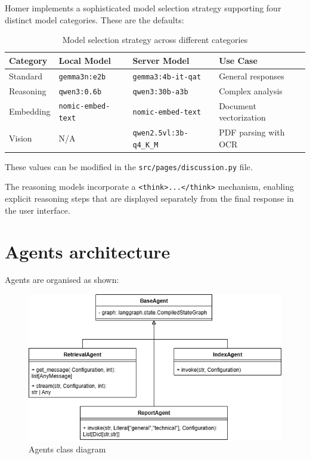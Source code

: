 \documentclass[11pt,a4paper]{report}
\begin{document}
Homer implements a sophisticated model selection strategy supporting four distinct model categories. These are the defaults:

\begin{table}[H]
\centering
\begin{tabular}{@{}llll@{}}
\toprule
\textbf{Category} & \textbf{Local Model} & \textbf{Server Model} & \textbf{Use Case} \\
\midrule
Standard & \texttt{gemma3n:e2b} & \texttt{gemma3:4b-it-qat} & General responses \\
Reasoning & \texttt{qwen3:0.6b} & \texttt{qwen3:30b-a3b} & Complex analysis \\
Embedding & \texttt{nomic-embed-text} & \texttt{nomic-embed-text} & Document vectorization \\
Vision & N/A & \texttt{qwen2.5vl:3b-q4\_K\_M} & PDF parsing with OCR \\
\bottomrule
\end{tabular}
\caption{Model selection strategy across different categories}
\label{tab:model-selection}
\end{table}

These values can be modified in the \texttt{src/pages/discussion.py} file.

The reasoning models incorporate a \texttt{<think>...</think>} mechanism, enabling explicit reasoning steps that are displayed separately from the final response in the user interface.

\section{Agents architecture}

Agents are organised as shown:

\begin{figure}[H]
    \centering
    \includegraphics[width=\linewidth]{static/schemas/classDiagramAgents.drawio.png}
    \caption{Agents class diagram}
    \label{fig:agents}
\end{figure}
\end{document}
